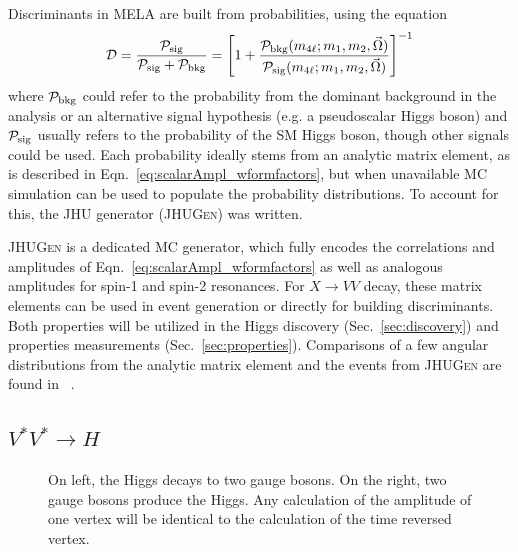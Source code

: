 Discriminants in MELA are built from probabilities, using the equation
\begin{equation}
\mathcal{D} = \frac{\mathcal{P}_{\rm{sig}}}{\mathcal{P}_{\rm{sig}} + \mathcal{P}_{\rm{bkg}}} = \left[1+ \frac{\mathcal{P}_{\rm{bkg}}(m_{4\ell};m_1,m_2,\vec{\Omega})}{\mathcal{P}_{\rm{sig}}(m_{4\ell};m_1,m_2,\vec{\Omega})}\right]^{-1}
\label{eq:MELADisc}
\end{equation}
where $\mathcal{P}_{\rm{bkg}}$ could refer to the probability from the dominant background in the analysis or an alternative signal hypothesis (e.g. a pseudoscalar Higgs boson) and $\mathcal{P}_{\rm{sig}}$ usually refers to the probability of the SM Higgs boson, though other signals could be used. Each probability ideally stems from an analytic matrix element, as is described in Eqn.~\ref{eq:scalarAmpl_wformfactors}, but when unavailable MC simulation can be used to populate the probability distributions. To account for this, the \textsc{JHU} generator (\textsc{JHUGen}) was written.

\textsc{JHUGen} is a dedicated MC generator, which fully encodes the correlations and amplitudes of Eqn.~\ref{eq:scalarAmpl_wformfactors} as well as analogous amplitudes for spin-1 and spin-2 resonances. For $X\rightarrow VV$ decay, these matrix elements can be used in event generation or directly for building discriminants. Both properties will be utilized in the Higgs discovery (Sec.~\ref{sec:discovery}) and properties measurements (Sec.~\ref{sec:properties}). Comparisons of a few angular distributions from the analytic matrix element and the events from \textsc{JHUGen} are found in ~\cite{Bolognesi:2012mm}.

\subsection{$V^{*}V^{*} \rightarrow H$}
\label{sec:VBFVertex}

\begin{figure}[htbp]
\begin{center}
\unitlength=1mm
\caption[Feynman Diagrams of the HVV vertex]{On left, the Higgs decays to two gauge bosons. On the right, two gauge bosons produce the Higgs. Any calculation of the amplitude of one vertex will be identical to the calculation of the time reversed vertex.}
\label{fig:HVVVertex}
\end{center}
\end{figure}

